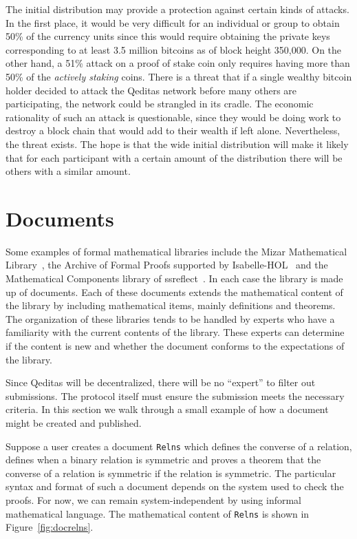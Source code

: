 \documentclass{article}
\begin{document}
The initial distribution may provide a protection against certain
kinds of attacks.
In the first place, it would be very difficult
for an individual or group to obtain 50\% of the currency units since this would
require obtaining the private keys corresponding to at least 3.5 million bitcoins
as of block height 350,000. On the other hand, a 51\% attack on a proof of stake
coin only requires having more than 50\% of the {\emph{actively staking}} coins.
There is a threat that if a single wealthy bitcoin holder decided to attack
the Qeditas network before many others are participating, the network could
be strangled in its cradle.
The economic rationality of such an attack is questionable, since they would be doing work to
destroy a block chain that would add to their wealth if left alone. Nevertheless,
the threat exists.
The hope is that the wide initial distribution will make it likely
that for each participant with a certain amount of the distribution
there will be others with a similar amount.

\section{Documents}\label{sec:docs}

Some examples of formal mathematical libraries include
the Mizar Mathematical Library~\cite{RudnickiTrybulec2001},
the Archive of Formal Proofs supported by
Isabelle-HOL~\cite{Nipkow-Paulson-Wenzel:2002}
and the Mathematical Components library of ssreflect~\cite{Gonthier2010}.
In each case the library is made up of documents.
Each of these documents extends the mathematical content of the library
by including mathematical items, mainly definitions and theorems.
The organization of these libraries tends to be handled by experts who have
a familiarity with the current contents of the library.
These experts can determine if the content is new and whether the document
conforms to the expectations of the library.

Since Qeditas will be decentralized, there will be no ``expert'' to filter out
submissions. The protocol itself must ensure the submission meets the necessary
criteria. In this section we walk through a small example of how a document
might be created and published.

Suppose a user creates a document {\tt{Relns}} which
defines the converse of a relation, defines when a binary relation is symmetric
and proves a theorem that the converse of a relation is symmetric if the relation is symmetric.
The particular syntax and format of such a document depends on the system
used to check the proofs. For now, we can remain system-independent by
using informal mathematical language.
The mathematical content of {\tt{Relns}} is shown in Figure~\ref{fig:docrelns}.
\end{document}
